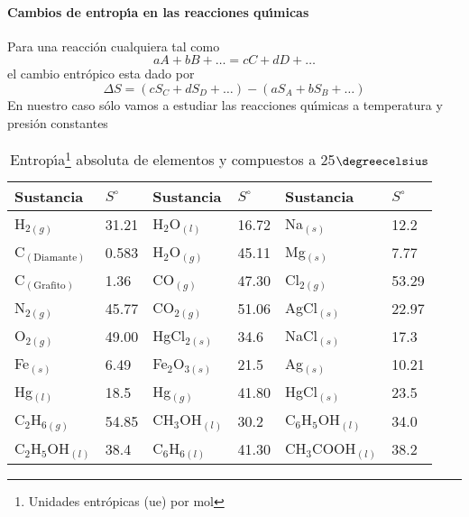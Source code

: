 \paragraph{Cambios de entrop\'{\i}a en las reacciones qu\'{\i}micas}
Para una reacci\'on cual\-quie\-ra tal como
\begin{equation}
aA +bB +\ldots = cC + dD + \ldots
\end{equation}
el cambio entr\'opico esta dado por
\begin{equation}
\Delta S = (cS_C + dS_D + \ldots) - (aS_A + bS_B + \ldots)
\end{equation}
En nuestro caso s\'olo vamos a estudiar las reacciones qu\'{\i}micas a tem\-pe\-ratura y presi\'on constantes

\begin{table} [ht]
\begin{minipage}{\linewidth}
\caption[Entrop\'{\i}a absoluta]{Entrop\'{\i}a\footnote{Unidades entr\'opicas (ue) por
mol } absoluta  de  elementos y compuestos a 25$\degreecelsius$}
\begin{center}
{\small \begin{tabular}{||ll|ll|ll||} \hline
\textbf{Sustancia}&\textbf{$S ^\circ$}&\textbf{Sustancia}&\textbf{$S^\circ$}
&\textbf{Sustancia}&\textbf{$S^\circ$}\\ \hline
 H$_{2(g)}$        & 31.21  & H$_2$O$_{(l)}$  & 16.72 & Na$_{(s)}$  & 12.2 \\ 
 C$_{(\mathrm{Diamante})}$  & 0.583  & H$_2$O$_{(g)}$  & 45.11 & Mg$_{(s)}$  & 7.77 \\ 
 C$_{(\mathrm{Grafito})}$   & 1.36   & CO$_{(g)}$      & 47.30 & Cl$_{2(g)}$ & 53.29\\ 
 N$_{2(g)}$        & 45.77  & CO$_{2(g)}$     & 51.06 & AgCl$_{(s)}$& 22.97\\
 O$_{2(g)}$        & 49.00  & HgCl$_{2(s)}$   & 34.6  & NaCl$_{(s)}$& 17.3 \\
 Fe$_{(s)}$        & 6.49   & Fe$_2$O$_{3(s)}$& 21.5  & Ag$_{(s)}$  & 10.21\\
 Hg$_{(l)}$        & 18.5   & Hg$_{(g)}$      & 41.80 & HgCl$_{(s)}$ & 23.5\\
 C$_2$H$_{6(g)}$   & 54.85  & CH$_3$OH$_{(l)}$& 30.2  & C$_6$H$_5$OH$_{(l)}$& 34.0\\
 C$_2$H$_5$OH$_{(l)}$&38.4  & C$_6$H$_{6(l)}$ & 41.30 & CH$_3$COOH$_{(l)}$&38.2 \\
 \hline 
\end{tabular}}
\label{tab:4}
\end{center}
\end{minipage}
\end{table}

